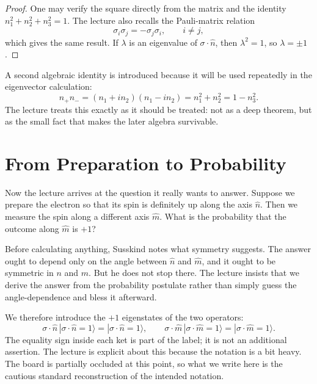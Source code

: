 \begin{proof}
One may verify the square directly from the matrix and the identity \(n_1^2+n_2^2+n_3^2=1\). The lecture also recalls the Pauli-matrix relation
\begin{equation}
\sigma_i\sigma_j=-\sigma_j\sigma_i,
\qquad i\neq j,
\end{equation}
which gives the same result. If \(\lambda\) is an eigenvalue of \(\sigma\cdot\hat n\), then \(\lambda^2=1\), so \(\lambda=\pm1\).
\end{proof}

A second algebraic identity is introduced because it will be used repeatedly in the eigenvector calculation:
\begin{equation}
n_+n_-=(n_1+i n_2)(n_1-i n_2)=n_1^2+n_2^2=1-n_3^2.
\end{equation}
The lecture treats this exactly as it should be treated: not as a deep theorem, but as the small fact that makes the later algebra survivable.

\section{From Preparation to Probability}

Now the lecture arrives at the question it really wants to answer. Suppose we prepare the electron so that its spin is definitely up along the axis \(\hat n\). Then we measure the spin along a different axis \(\hat m\). What is the probability that the outcome along \(\hat m\) is \(+1\)?

Before calculating anything, Susskind notes what symmetry suggests. The answer ought to depend only on the angle between \(\hat n\) and \(\hat m\), and it ought to be symmetric in \(n\) and \(m\). But he does not stop there. The lecture insists that we derive the answer from the probability postulate rather than simply guess the angle-dependence and bless it afterward.

We therefore introduce the \(+1\) eigenstates of the two operators:
\begin{equation}
\sigma\cdot\hat n\,|\sigma\cdot\hat n=1\rangle
=
|\sigma\cdot\hat n=1\rangle,
\qquad
\sigma\cdot\hat m\,|\sigma\cdot\hat m=1\rangle
=
|\sigma\cdot\hat m=1\rangle.
\end{equation}
The equality sign inside each ket is part of the label; it is not an additional assertion. The lecture is explicit about this because the notation is a bit heavy. The board is partially occluded at this point, so what we write here is the cautious standard reconstruction of the intended notation.

